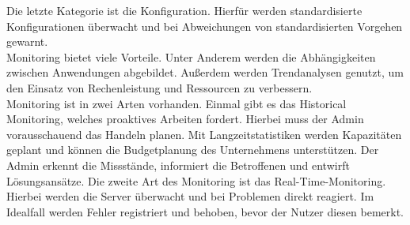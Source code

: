 {Die letzte Kategorie ist die Konfiguration.
Hierfür werden standardisierte Konfigurationen überwacht und bei Abweichungen von standardisierten Vorgehen gewarnt.
\\
Monitoring bietet viele Vorteile.
Unter Anderem werden die Abhängigkeiten zwischen Anwendungen abgebildet.
Außerdem werden Trendanalysen genutzt, um den Einsatz von Rechenleistung und Ressourcen zu verbessern.
\\
Monitoring ist in zwei Arten vorhanden.
Einmal gibt es das Historical Monitoring, welches proaktives Arbeiten fordert.
Hierbei muss der Admin vorausschauend das Handeln planen.
Mit Langzeitstatistiken werden Kapazitäten geplant und können die Budgetplanung des Unternehmens unterstützen.
Der Admin erkennt die Missstände, informiert die Betroffenen und entwirft Lösungsansätze.
Die zweite Art des Monitoring ist das Real-Time-Monitoring.
Hierbei werden die Server überwacht und bei Problemen direkt reagiert.
Im Idealfall werden Fehler registriert und behoben, bevor der Nutzer diesen bemerkt.
}\autocite{cloudradar, wbs, crossmedia}

